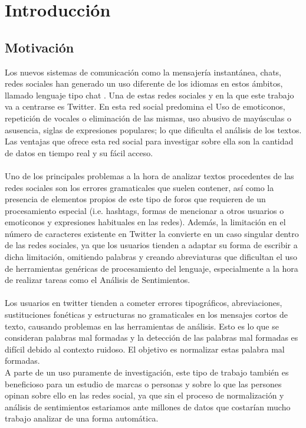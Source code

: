\documentclass[14pt]{extarticle}
\theoremstyle{definition}
\theoremstyle{remark}
\begin{document}
\section{Introducción}\label{sec:introduccion}
\subsection{Motivación}\label{sec:motivacion}
Los nuevos sistemas de comunicación como la mensajería instantánea, chats, redes sociales han generado un uso diferente de los idiomas en estos ámbitos, llamado lenguaje tipo chat \citep{forsyth:2007}. Una de estas redes sociales y en la que este trabajo va a centrarse es Twitter. En esta red social predomina el Uso de emoticonos, repetición de vocales o eliminación de las mismas, uso abusivo de mayúsculas o asusencia, siglas de expresiones populares; lo que dificulta el análisis de los textos. Las ventajas que ofrece esta red social para investigar sobre ella son la cantidad de datos en tiempo real y su fácil acceso.\\\\Uno de los principales problemas a la hora de analizar textos procedentes de las redes sociales son los errores gramaticales que suelen contener, así como la presencia de elementos propios de este tipo de foros que requieren de un procesamiento especial (i.e. hashtags, formas de mencionar a otros usuarios o emoticonos y expresiones habituales en las redes). Además, la limitación en el número de caracteres existente en Twitter la convierte en un caso singular dentro de las redes sociales, ya que los usuarios tienden a adaptar su forma de escribir a dicha limitación, omitiendo palabras y creando abreviaturas que dificultan el uso de herramientas genéricas de procesamiento del lenguaje, especialmente a la hora de realizar tareas como el Análisis de Sentimientos.\\\\Los usuarios en twitter tienden a cometer errores tipográficos, abreviaciones, sustituciones fonéticas y estructuras no gramaticales en los mensajes cortos de texto, causando problemas en las herramientas de análisis. Esto es lo que se consideran palabras mal formadas y la detección de las palabras mal formadas es difícil debido al contexto ruidoso. El objetivo es normalizar estas palabra mal formadas.\\A parte de un uso puramente de investigación, este tipo de trabajo también es beneficioso para un estudio de marcas o personas y sobre lo que las persones opinan sobre ello en las redes social, ya que sin el proceso de normalización y análisis de sentimientos estariamos ante millones de datos que costarían mucho trabajo analizar de una forma automática.
\end{document}

